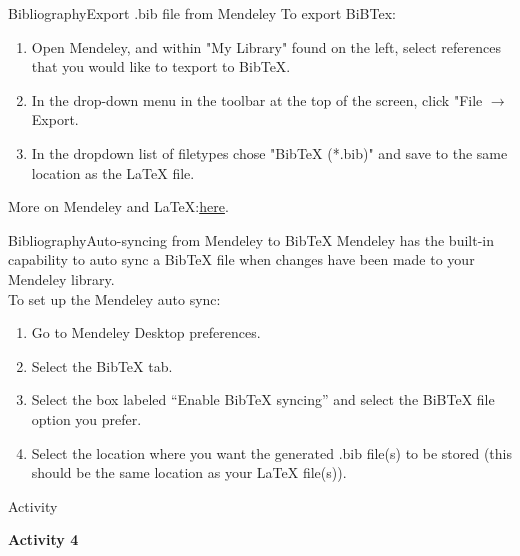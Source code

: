 \documentclass{bredelebeamer}
\begin{document}
\begin{frame}{Bibliography}{Export .bib file from Mendeley}
To export BiBTex:
\begin{enumerate}
	\item Open Mendeley, and within "My Library" found on the left, select references that you would like to texport to BibTeX.
	\item In the drop-down menu in the toolbar at the top of the screen, click "File $\rightarrow$ Export.
	\item In the dropdown list of filetypes chose "BibTeX (*.bib)" and save to the same location as the LaTeX file.
\end{enumerate}

\alert{More on Mendeley and LaTeX}:\href{http://libguides.mit.edu/c.php?g=176186\&p=1159535\#3}{here}.
\end{frame}


\begin{frame}[<+->]{Bibliography}{Auto-syncing from Mendeley to BibTeX}
Mendeley has the built-in capability to auto sync a BibTeX file when changes have been made to your Mendeley library.\\
To set up the Mendeley auto sync:
\begin{enumerate}
	\item Go to Mendeley Desktop preferences.
	\item Select the BibTeX tab. 
	\item Select the box labeled “Enable BibTeX syncing” and select the BiBTeX file option you prefer.
	\item Select the location where you want the generated .bib file(s) to be stored (this should be the same location as your LaTeX file(s)).
\end{enumerate}
\end{frame}

\begin{frame}[fragile]{Activity}
\begin{center}
{\Large \textbf{Activity 4}}
\end{center}

\end{frame}
\end{document}
